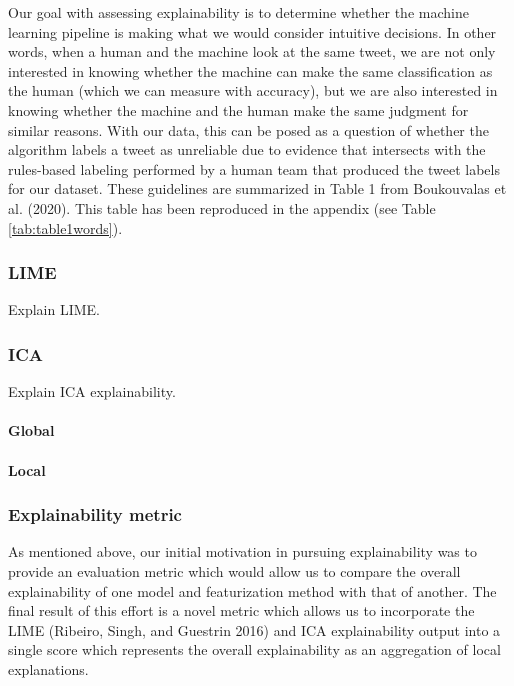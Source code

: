 \documentclass{article}
\begin{document}
Our goal with assessing explainability is to determine whether the
machine learning pipeline is making what we would consider intuitive
decisions. In other words, when a human and the machine look at the same
tweet, we are not only interested in knowing whether the machine can
make the same classification as the human (which we can measure with
accuracy), but we are also interested in knowing whether the machine and
the human make the same judgment for similar reasons. With our data,
this can be posed as a question of whether the algorithm labels a tweet
as unreliable due to evidence that intersects with the rules-based
labeling performed by a human team that produced the tweet labels for
our dataset. These guidelines are summarized in Table 1 from Boukouvalas
et al. (2020). This table has been reproduced in the appendix (see Table
\ref{tab:table1words}).

\hypertarget{lime}{%
\subsubsection{LIME}\label{lime}}

Explain LIME.

\hypertarget{ica}{%
\subsubsection{ICA}\label{ica}}

Explain ICA explainability.

\hypertarget{global}{%
\paragraph{Global}\label{global}}

\hypertarget{local}{%
\paragraph{Local}\label{local}}

\hypertarget{explainability-metric}{%
\subsubsection{Explainability metric}\label{explainability-metric}}

As mentioned above, our initial motivation in pursuing explainability
was to provide an evaluation metric which would allow us to compare the
overall explainability of one model and featurization method with that
of another. The final result of this effort is a novel metric which
allows us to incorporate the LIME (Ribeiro, Singh, and Guestrin 2016)
and ICA explainability output into a single score which represents the
overall explainability as an aggregation of local explanations.
\end{document}
